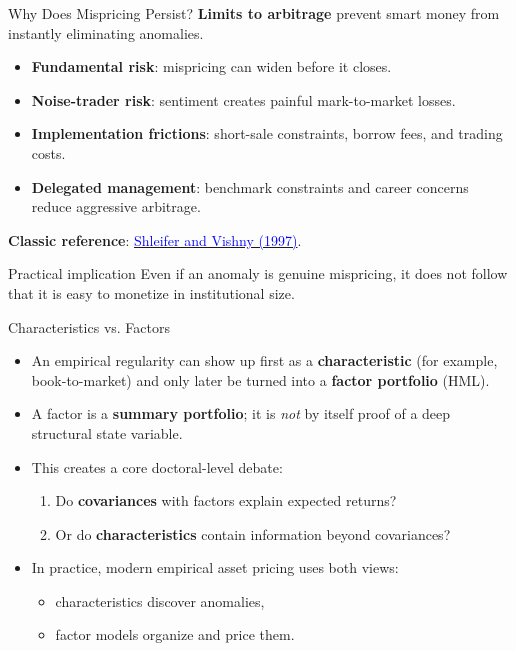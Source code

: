 \documentclass{beamer}
\begin{document}
\begin{frame}{Why Does Mispricing Persist?}
	\textbf{Limits to arbitrage} prevent smart money from instantly eliminating anomalies.

	\begin{itemize}
		\item \textbf{Fundamental risk}: mispricing can widen before it closes.
		\item \textbf{Noise-trader risk}: sentiment creates painful mark-to-market losses.
		\item \textbf{Implementation frictions}: short-sale constraints, borrow fees, and trading costs.
		\item \textbf{Delegated management}: benchmark constraints and career concerns reduce aggressive arbitrage.
	\end{itemize}

	\vspace{0.2cm}
	\textbf{Classic reference}: \href{https://doi.org/10.1111/j.1540-6261.1997.tb03807.x}{\textcolor{blue}{Shleifer and Vishny (1997)}}.

	\vspace{0.3cm}
	\begin{block}{Practical implication}
		Even if an anomaly is genuine mispricing, it does not follow that it is easy to monetize in institutional size.
	\end{block}
\end{frame}

\begin{frame}{Characteristics vs. Factors}
	\begin{itemize}
		\item An empirical regularity can show up first as a \textbf{characteristic} (for example, book-to-market) and only later be turned into a \textbf{factor portfolio} (HML).
		\item A factor is a \textbf{summary portfolio}; it is \textit{not} by itself proof of a deep structural state variable.
		\item This creates a core doctoral-level debate:
		\begin{enumerate}
			\item Do \textbf{covariances} with factors explain expected returns?
			\item Or do \textbf{characteristics} contain information beyond covariances?
		\end{enumerate}
		\item In practice, modern empirical asset pricing uses both views:
		\begin{itemize}
			\item characteristics discover anomalies,
			\item factor models organize and price them.
		\end{itemize}
	\end{itemize}
\end{frame}
\end{document}
